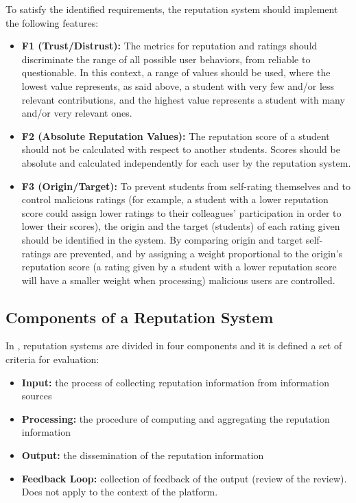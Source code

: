 To satisfy the identified requirements, the reputation system should implement the following features:
\begin{itemize}
\item \textbf{F1 (Trust/Distrust):} The metrics for reputation and ratings should discriminate the range of all possible user behaviors, from reliable to questionable. In this context, a range of values should be used, where the lowest value represents, as said above, a student with very few and/or less relevant contributions, and the highest value represents a student with many and/or very relevant ones. 

\item \textbf{F2 (Absolute Reputation Values):} The reputation score of a student should not be calculated with respect to another students. Scores should be absolute and calculated independently for each user by the reputation system.

\item \textbf{F3 (Origin/Target):} To prevent students from self-rating themselves and to control malicious ratings (for example, a student with a lower reputation score could assign lower ratings to their colleagues' participation in order to lower their scores), the origin and the target (students) of each rating given should be identified in the system. By comparing origin and target self-ratings are prevented, and by assigning a weight proportional to the origin's reputation score (a rating given by a student with a lower reputation score will have a smaller weight when processing) malicious users are controlled.
\end{itemize}

\subsection{Components of a Reputation System}
In \cite{liu2012systematic,liu2010evaluation}, reputation systems are divided in four components and it is defined a set of criteria for evaluation:

\begin{itemize}
\item \textbf{Input:} the process of collecting reputation information from information sources
\item \textbf{Processing:} the procedure of computing and aggregating the reputation information
\item \textbf{Output:} the dissemination of the reputation information
\item \textbf{Feedback Loop:} collection of feedback of the output (review of the review). Does not apply to the context of the platform.
\end{itemize}

